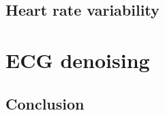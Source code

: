 \documentclass[11pt]{report}
\begin{document}
	\section{Heart rate variability}
		


		
\chapter{ECG denoising}


\newpage
\section*{Conclusion}
\end{document}
